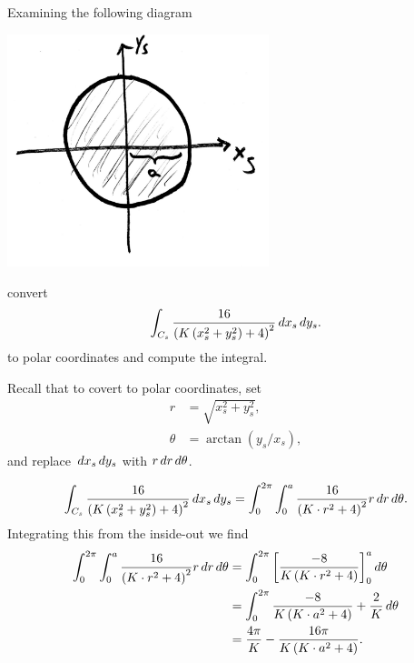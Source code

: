 \documentclass{ximera}
\begin{document}
\begin{problem}
  Examining the following diagram
  \begin{image}
    \includegraphics[width=3in]{stereoCirc.png}
  \end{image}
  convert
  \[
  \int_{C_s} \frac{16}{\left(K\left(x_s^2+y_s^2\right)+4\right)^2} \,d x_s\,d y_s.
  \]
  to polar coordinates and compute the integral.
  \begin{hint}
    Recall that to covert to polar coordinates, set
    \begin{align*}
      r &= \sqrt{x_s^2+y_s^2},\\
      \theta &= \arctan(y_s/x_s),
    \end{align*}
    and replace $\,d x_s\,d y_s$ with $r\,d r\,d \theta$.
  \end{hint}
  \begin{freeResponse}
    \[
    \int_{C_s} \frac{16}{\left(K\left(x_s^2+y_s^2\right)+4\right)^2} \,d x_s\,d y_s
    = \int_0^{2\pi} \int_0^a \frac{16}{\left(K\cdot r^2+4\right)^2} r\,d r \,d \theta.
    \]
    Integrating this from the inside-out we find
    \begin{align*}
      \int_0^{2\pi} \int_0^a \frac{16}{\left(K\cdot r^2+4\right)^2} r\,d r \,d \theta
      &= \int_0^{2\pi} \bigg[ \frac{-8}{K\left(K\cdot r^2+4\right)} \bigg]_0^a \,d \theta\\
      &= \int_0^{2\pi} \frac{-8}{K\left(K\cdot a^2+4\right)}+\frac{2}{K} \,d \theta\\
      &= \frac{4\pi}{K}-\frac{16\pi}{K\left(K\cdot a^2+4\right)}.   
    \end{align*}
  \end{freeResponse}
\end{problem}
\end{document}
